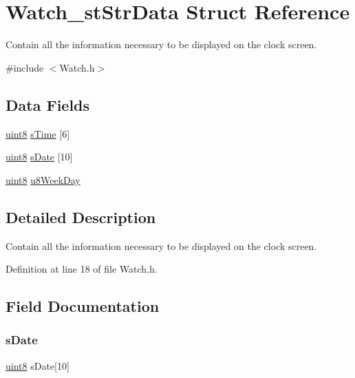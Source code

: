 \hypertarget{struct_watch__st_str_data}{}\section{Watch\+\_\+st\+Str\+Data Struct Reference}
\label{struct_watch__st_str_data}


Contain all the information necessary to be displayed on the clock screen.  




{\ttfamily \#include $<$Watch.\+h$>$}

\subsection*{Data Fields}
\begin{DoxyCompactItemize}
\item 
\mbox{\hyperlink{_p_i_t_8h_adde6aaee8457bee49c2a92621fe22b79}{uint8}} \mbox{\hyperlink{struct_watch__st_str_data_add4de7b4e18487b32279fe59da546907}{s\+Time}} \mbox{[}6\mbox{]}
\item 
\mbox{\hyperlink{_p_i_t_8h_adde6aaee8457bee49c2a92621fe22b79}{uint8}} \mbox{\hyperlink{struct_watch__st_str_data_af0cb5ecd1685879a8f52bd700ed65b49}{s\+Date}} \mbox{[}10\mbox{]}
\item 
\mbox{\hyperlink{_p_i_t_8h_adde6aaee8457bee49c2a92621fe22b79}{uint8}} \mbox{\hyperlink{struct_watch__st_str_data_abe5f8ac7f28cee19ee69b12602da9adc}{u8\+Week\+Day}}
\end{DoxyCompactItemize}


\subsection{Detailed Description}
Contain all the information necessary to be displayed on the clock screen. 

Definition at line 18 of file Watch.\+h.



\subsection{Field Documentation}
\mbox{\label{struct_watch__st_str_data_af0cb5ecd1685879a8f52bd700ed65b49}} 
\subsubsection{\texorpdfstring{sDate}{sDate}}
{\footnotesize\ttfamily \mbox{\hyperlink{_p_i_t_8h_adde6aaee8457bee49c2a92621fe22b79}{uint8}} s\+Date\mbox{[}10\mbox{]}}


